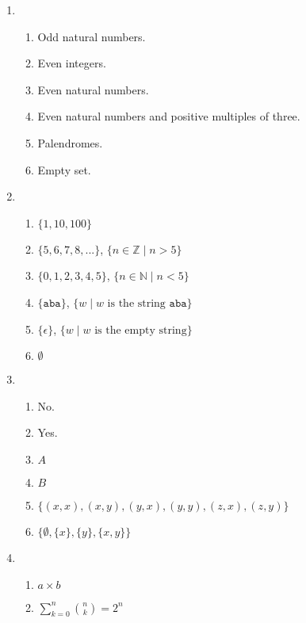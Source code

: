 \documentclass[11pt]{article}
\begin{document}
\begin{enumerate}[0.1]
  \item
  \begin{enumerate}
    \item Odd natural numbers.
    \item Even integers.
    \item Even natural numbers.
    \item Even natural numbers and positive multiples of three.
    \item Palendromes.
    \item Empty set.
  \end{enumerate}
  \item
  \begin{enumerate}
    \item $\{1,10,100\}$
    \item $\{5,6,7,8,...\}$, $\{n \in \mathbb{Z} \mid n > 5\}$
    \item $\{0,1,2,3,4,5\}$, $\{n \in \mathbb{N} \mid n < 5\}$
    \item $\{\texttt{aba}\}$, $\{w \mid w \text{ is the string } \texttt{aba}\}$
    \item $\{\epsilon\}$, $\{w \mid w \text{ is the empty string}\}$
    \item $\emptyset$
  \end{enumerate}
  \item
  \begin{enumerate}
    \item No.
    \item Yes.
    \item $A$
    \item $B$
    \item $\{(x,x),(x,y),(y,x),(y,y),(z,x),(z,y)\}$
    \item $\{\emptyset,\{x\},\{y\},\{x,y\}\}$
  \end{enumerate}
  \item
  \begin{enumerate}
    \item $a \times b$
    \item $\sum_{k=0}^n \binom{n}{k} = 2^n$
  \end{enumerate}
\end{enumerate}
\end{document}
